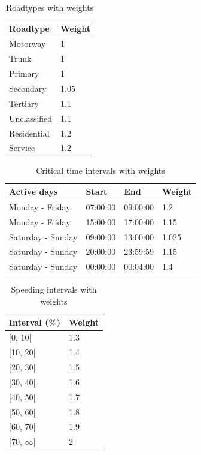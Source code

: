 \begin{table}
    \begin{tabular}{ll}
    \textbf{Roadtype} & \textbf{Weight} \\ \hline
    Motorway          & 1               \\
    Trunk             & 1               \\
    Primary           & 1               \\
    Secondary         & 1.05            \\
    Tertiary          & 1.1             \\
    Unclassified      & 1.1             \\
    Residential       & 1.2             \\
    Service           & 1.2             \\ \hline
    \end{tabular}
    \caption{Roadtypes with weights}
    \label{tab:roadtypevalues}
\end{table}

\begin{table}
    \begin{tabular}{llll}
    \textbf{Active days} & \textbf{Start} & \textbf{End} & \textbf{Weight} \\ \hline
    Monday - Friday      & 07:00:00       & 09:00:00     & 1.2             \\
    Monday - Friday      & 15:00:00       & 17:00:00     & 1.15            \\
    Saturday - Sunday    & 09:00:00       & 13:00:00     & 1.025           \\
    Saturday - Sunday    & 20:00:00       & 23:59:59     & 1.15            \\
    Saturday - Sunday    & 00:00:00       & 00:04:00     & 1.4             \\ \hline
    \end{tabular}
    \caption{Critical time intervals with weights}
    \label{tab:crittimevalues}
\end{table}

\begin{table}
    \begin{tabular}{ll}
    \textbf{Interval (\%)}   & \textbf{Weight} \\ \hline
    {[}0, 10{[}        & 1.3                   \\
    {[}10, 20{[}       & 1.4                   \\
    {[}20, 30{[}       & 1.5                   \\
    {[}30, 40{[}       & 1.6                   \\
    {[}40, 50{[}       & 1.7                   \\
    {[}50, 60{[}       & 1.8                   \\
    {[}60, 70{[}       & 1.9                   \\
    {[}70, $\infty${]} & 2                     \\ \hline
    \end{tabular}
    \caption{Speeding intervals with weights}
    \label{tab:speedingvalues}
\end{table}

